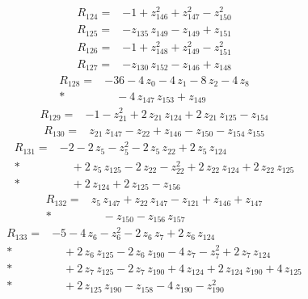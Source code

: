 \documentclass[10pt]{article}
\begin{document}
\begin{align*}
R_{124}={}& - 1 + z_{146}^{2} + z_{147}^{2} - z_{150}^{2}
\end{align*}
\begin{align*}
R_{125}={}& - z_{135}\,z_{149} - z_{149} + z_{151}
\end{align*}
\begin{align*}
R_{126}={}& - 1 + z_{148}^{2} + z_{149}^{2} - z_{151}^{2}
\end{align*}
\begin{align*}
R_{127}={}& - z_{130}\,z_{152} - z_{146} + z_{148}
\end{align*}
\begin{align*}
R_{128}={}& - 36 - 4\,z_{0} - 4\,z_{1} - 8\,z_{2} - 4\,z_{8} \\*
&\quad - 4\,z_{147}\,z_{153} + z_{149}
\end{align*}
\begin{align*}
R_{129}={}& - 1 - z_{21}^{2} + 2\,z_{21}\,z_{124} + 2\,z_{21}\,z_{125} - z_{154}
\end{align*}
\begin{align*}
R_{130}={}& z_{21}\,z_{147} - z_{22} + z_{146} - z_{150} - z_{154}\,z_{155}
\end{align*}
\begin{align*}
R_{131}={}& - 2 - 2\,z_{5} - z_{5}^{2} - 2\,z_{5}\,z_{22} + 2\,z_{5}\,z_{124} \\*
&\quad + 2\,z_{5}\,z_{125} - 2\,z_{22} - z_{22}^{2} + 2\,z_{22}\,z_{124} + 2\,z_{22}\,z_{125} \\*
&\quad + 2\,z_{124} + 2\,z_{125} - z_{156}
\end{align*}
\begin{align*}
R_{132}={}& z_{5}\,z_{147} + z_{22}\,z_{147} - z_{121} + z_{146} + z_{147} \\*
&\quad - z_{150} - z_{156}\,z_{157}
\end{align*}
\begin{align*}
R_{133}={}& - 5 - 4\,z_{6} - z_{6}^{2} - 2\,z_{6}\,z_{7} + 2\,z_{6}\,z_{124} \\*
&\quad + 2\,z_{6}\,z_{125} - 2\,z_{6}\,z_{190} - 4\,z_{7} - z_{7}^{2} + 2\,z_{7}\,z_{124} \\*
&\quad + 2\,z_{7}\,z_{125} - 2\,z_{7}\,z_{190} + 4\,z_{124} + 2\,z_{124}\,z_{190} + 4\,z_{125} \\*
&\quad + 2\,z_{125}\,z_{190} - z_{158} - 4\,z_{190} - z_{190}^{2}
\end{align*}
\end{document}
